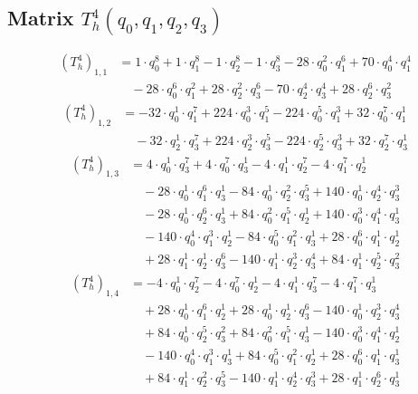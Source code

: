 \subsection{Matrix $T_{h}^4(q_0,q_1,q_2,q_3)$}
\begin{align*}(T_{h}^4)_{1,1}&=1\cdot q_0^{8}+1\cdot q_1^{8}-1\cdot q_2^{8}-1\cdot q_3^{8}-28\cdot q_0^{2}\cdot q_1^{6}+70\cdot q_0^{4}\cdot q_1^{4}\\
&\quad -28\cdot q_0^{6}\cdot q_1^{2}+28\cdot q_2^{2}\cdot q_3^{6}-70\cdot q_2^{4}\cdot q_3^{4}+28\cdot q_2^{6}\cdot q_3^{2}\end{align*}
\begin{align*}(T_{h}^4)_{1,2}&=-32\cdot q_0^{1}\cdot q_1^{7}+224\cdot q_0^{3}\cdot q_1^{5}-224\cdot q_0^{5}\cdot q_1^{3}+32\cdot q_0^{7}\cdot q_1^{1}\\
&\quad -32\cdot q_2^{1}\cdot q_3^{7}+224\cdot q_2^{3}\cdot q_3^{5}-224\cdot q_2^{5}\cdot q_3^{3}+32\cdot q_2^{7}\cdot q_3^{1}\end{align*}
\begin{align*}(T_{h}^4)_{1,3}&=4\cdot q_0^{1}\cdot q_3^{7}+4\cdot q_0^{7}\cdot q_3^{1}-4\cdot q_1^{1}\cdot q_2^{7}-4\cdot q_1^{7}\cdot q_2^{1}\\
&\quad -28\cdot q_0^{1}\cdot q_1^{6}\cdot q_3^{1}-84\cdot q_0^{1}\cdot q_2^{2}\cdot q_3^{5}+140\cdot q_0^{1}\cdot q_2^{4}\cdot q_3^{3}\\
&\quad -28\cdot q_0^{1}\cdot q_2^{6}\cdot q_3^{1}+84\cdot q_0^{2}\cdot q_1^{5}\cdot q_2^{1}+140\cdot q_0^{3}\cdot q_1^{4}\cdot q_3^{1}\\
&\quad -140\cdot q_0^{4}\cdot q_1^{3}\cdot q_2^{1}-84\cdot q_0^{5}\cdot q_1^{2}\cdot q_3^{1}+28\cdot q_0^{6}\cdot q_1^{1}\cdot q_2^{1}\\
&\quad +28\cdot q_1^{1}\cdot q_2^{1}\cdot q_3^{6}-140\cdot q_1^{1}\cdot q_2^{3}\cdot q_3^{4}+84\cdot q_1^{1}\cdot q_2^{5}\cdot q_3^{2}\end{align*}
\begin{align*}(T_{h}^4)_{1,4}&=-4\cdot q_0^{1}\cdot q_2^{7}-4\cdot q_0^{7}\cdot q_2^{1}-4\cdot q_1^{1}\cdot q_3^{7}-4\cdot q_1^{7}\cdot q_3^{1}\\
&\quad +28\cdot q_0^{1}\cdot q_1^{6}\cdot q_2^{1}+28\cdot q_0^{1}\cdot q_2^{1}\cdot q_3^{6}-140\cdot q_0^{1}\cdot q_2^{3}\cdot q_3^{4}\\
&\quad +84\cdot q_0^{1}\cdot q_2^{5}\cdot q_3^{2}+84\cdot q_0^{2}\cdot q_1^{5}\cdot q_3^{1}-140\cdot q_0^{3}\cdot q_1^{4}\cdot q_2^{1}\\
&\quad -140\cdot q_0^{4}\cdot q_1^{3}\cdot q_3^{1}+84\cdot q_0^{5}\cdot q_1^{2}\cdot q_2^{1}+28\cdot q_0^{6}\cdot q_1^{1}\cdot q_3^{1}\\
&\quad +84\cdot q_1^{1}\cdot q_2^{2}\cdot q_3^{5}-140\cdot q_1^{1}\cdot q_2^{4}\cdot q_3^{3}+28\cdot q_1^{1}\cdot q_2^{6}\cdot q_3^{1}\end{align*}
